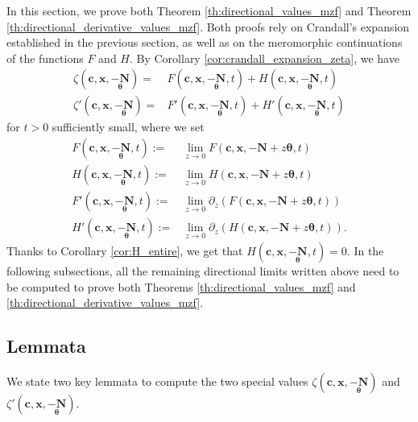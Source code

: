 \documentclass[a4paper]{amsart}
\theoremstyle{remark}
\theoremstyle{definition}
\begin{document}
In this section, we prove both Theorem \ref{th:directional_values_mzf} and Theorem \ref{th:directional_derivative_values_mzf}. Both proofs rely on Crandall's expansion established in the previous section, as well as on the meromorphic continuations of the functions $F$ and $H$. By Corollary \ref{cor:crandall_expansion_zeta}, we have
\begin{align}
    \zeta(\mathbf{c},\mathbf{x},\underset{\bm{\theta}}{-\mathbf{N}})=&F(\mathbf{c},\mathbf{x},\underset{\bm{\theta}}{-\mathbf{N}},t)+H(\mathbf{c},\mathbf{x},\underset{\bm{\theta}}{-\mathbf{N}},t) \label{eq:value_zeta_nonpositive_primary} \\
    \zeta'(\mathbf{c},\mathbf{x},\underset{\bm{\theta}}{-\mathbf{N}})=& F'(\mathbf{c},\mathbf{x},\underset{\bm{\theta}}{-\mathbf{N}},t)+H'(\mathbf{c},\mathbf{x},\underset{\bm{\theta}}{-\mathbf{N}},t) \label{eq:value_zeta_prime_nonpositive_primary}
\end{align}
for $t>0$ sufficiently small, where we set
\begin{align*}
    F(\mathbf{c},\mathbf{x},\underset{\bm{\theta}}{-\mathbf{N}},t) :=& \lim_{z \to 0} F(\mathbf{c},\mathbf{x},-\mathbf{N}+z\bm{\theta},t) \\
    H(\mathbf{c},\mathbf{x},\underset{\bm{\theta}}{-\mathbf{N}},t) :=& \lim_{z \to 0} H(\mathbf{c},\mathbf{x},-\mathbf{N}+z\bm{\theta},t) \\
    F'(\mathbf{c},\mathbf{x},\underset{\bm{\theta}}{-\mathbf{N}},t) :=& \lim_{z \to 0} \partial_z \left( F(\mathbf{c},\mathbf{x},-\mathbf{N}+z\bm{\theta},t) \right) \\
    H'(\mathbf{c},\mathbf{x},\underset{\bm{\theta}}{-\mathbf{N}},t) :=& \lim_{z \to 0} \partial_z \left( H(\mathbf{c},\mathbf{x},-\mathbf{N}+z\bm{\theta},t)\right).
\end{align*}
Thanks to Corollary \ref{cor:H_entire}, we get that $H(\mathbf{c},\mathbf{x},\underset{\bm{\theta}}{-\mathbf{N}},t)=0$. In the following subsections, all the remaining directional limits written above need to be computed to prove both Theorems \ref{th:directional_values_mzf} and \ref{th:directional_derivative_values_mzf}.

\subsection{Lemmata}
\label{subsection:lemmata_values}

We state two key lemmata to compute the two special values $\zeta(\mathbf{c},\mathbf{x},\underset{\bm{\theta}}{-\mathbf{N}})$ and $\zeta'(\mathbf{c},\mathbf{x},\underset{\bm{\theta}}{-\mathbf{N}})$.
\end{document}
